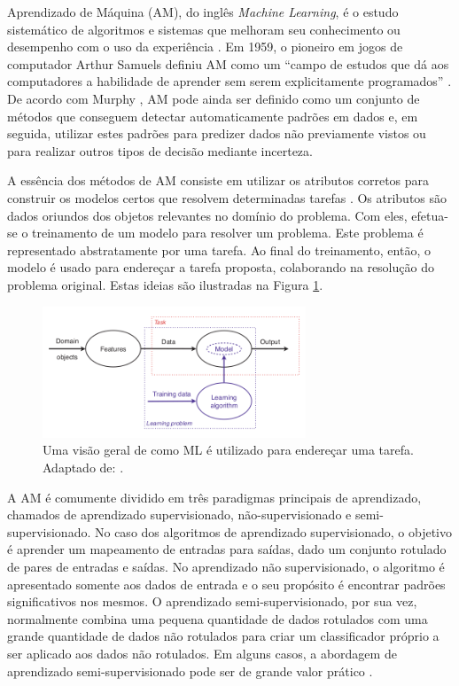 
Aprendizado de Máquina (AM), do inglês \emph{Machine Learning}, é o estudo sistemático de algoritmos e sistemas que melhoram seu conhecimento ou desempenho com o uso da experiência \cite{flach}. Em 1959, o pioneiro em jogos de computador Arthur Samuels definiu AM como um ``campo de estudos que dá aos computadores a habilidade de aprender sem serem explicitamente programados'' \cite{simon}. De acordo com Murphy \cite{murphy} , AM pode ainda ser definido como um conjunto de métodos que conseguem detectar automaticamente padrões em dados e, em seguida, utilizar estes padrões para predizer dados não previamente vistos ou para realizar outros tipos de decisão mediante incerteza.

A essência dos métodos de AM consiste em utilizar os atributos corretos para construir os modelos certos que resolvem determinadas tarefas \cite{flach}. Os atributos são dados oriundos dos objetos relevantes no domínio do problema. Com eles, efetua-se o treinamento de um modelo para resolver um problema. Este problema é representado abstratamente por uma tarefa. Ao final do treinamento, então, o modelo é usado para endereçar a tarefa  proposta, colaborando na resolução do problema original. Estas ideias são ilustradas na Figura  \ref{fig:tasks}.

\begin{figure}[h!]
\centering
\caption{Uma visão geral de como ML é utilizado para endereçar uma tarefa. Adaptado de: \cite{flach}.}
\label{fig:tasks}
\includegraphics[width=0.7\textwidth]{imgs/tasks}
\end{figure}

A AM é comumente dividido em três paradigmas principais de aprendizado, chamados de aprendizado supervisionado, não-supervisionado e semi-supervisionado. No caso dos algoritmos de aprendizado supervisionado, o objetivo é aprender um mapeamento de entradas para saídas, dado um conjunto rotulado de pares de entradas e saídas. No aprendizado não supervisionado, o algoritmo é apresentado somente aos dados de entrada e o seu propósito é encontrar padrões significativos nos mesmos. O aprendizado semi-supervisionado, por sua vez, normalmente combina uma pequena quantidade de dados rotulados com uma grande quantidade de dados não rotulados para criar um classificador próprio a ser aplicado aos dados não rotulados. Em alguns casos, a abordagem de aprendizado semi-supervisionado pode ser de grande valor prático \cite{khan}.

